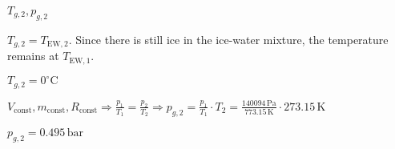 \( T_{g,2}, p_{g,2} \)  

\( T_{g,2} = T_{\text{EW},2} \). Since there is still ice in the ice-water mixture, the temperature remains at \( T_{\text{EW},1} \).  

\( T_{g,2} = 0^\circ \text{C} \)  

\( V_{\text{const}}, m_{\text{const}}, R_{\text{const}} \Rightarrow \frac{p_1}{T_1} = \frac{p_2}{T_2} \Rightarrow p_{g,2} = \frac{p_1}{T_1} \cdot T_2 = \frac{140094 \, \text{Pa}}{773.15 \, \text{K}} \cdot 273.15 \, \text{K} \)  

\( p_{g,2} = 0.495 \, \text{bar} \)